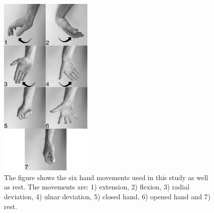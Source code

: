 \begin{figure}[H] 
	\includegraphics[width=0.4\textwidth]{figures/handGestures/BW/allHandMovementsVerticalBW}
	\caption{The figure shows the six hand movements used in this study as well as rest. The movements are: 1) extension, 2) flexion, 3) radial deviation, 4) ulnar deviation, 5) closed hand, 6) opened hand and 7) rest.}
	\label{fig:handMovements}
\end{figure}




